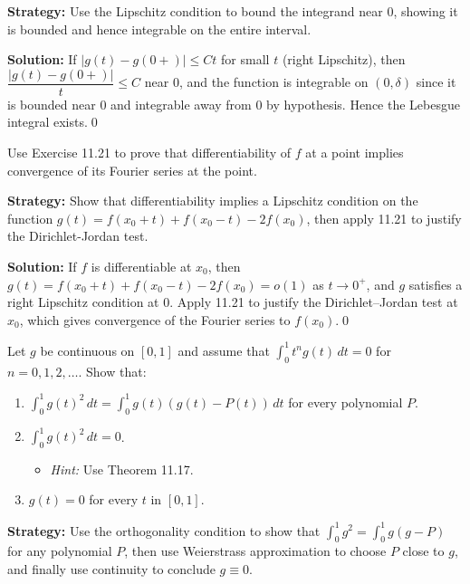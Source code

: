 \noindent\textbf{Strategy:} Use the Lipschitz condition to bound the integrand near 0, showing it is bounded and hence integrable on the entire interval.

\bigskip\noindent\textbf{Solution:}
If $|g(t)-g(0+)|\le C t$ for small $t$ (right Lipschitz), then $\dfrac{|g(t)-g(0+)|}{t}\le C$ near $0$, and the function is integrable on $(0,\delta)$ since it is bounded near $0$ and integrable away from $0$ by hypothesis. Hence the Lebesgue integral exists.\qed


\begin{problembox}
Use Exercise 11.21 to prove that differentiability of $f$ at a point implies convergence of its Fourier series at the point.
\end{problembox}

\noindent\textbf{Strategy:} Show that differentiability implies a Lipschitz condition on the function $g(t)=f(x_0+t)+f(x_0-t)-2f(x_0)$, then apply 11.21 to justify the Dirichlet-Jordan test.

\bigskip\noindent\textbf{Solution:}
If $f$ is differentiable at $x_0$, then $g(t)=f(x_0+t)+f(x_0-t)-2f(x_0)=o(1)$ as $t\to0^+$, and $g$ satisfies a right Lipschitz condition at $0$. Apply 11.21 to justify the Dirichlet–Jordan test at $x_0$, which gives convergence of the Fourier series to $f(x_0)$.\qed


\begin{problembox}
Let $g$ be continuous on $[0, 1]$ and assume that $\int_0^1 t^n g(t) \, dt = 0$ for $n = 0, 1, 2, \dots$. Show that:
\begin{enumerate}[label=(\alph*)]
\item $\int_0^1 g(t)^2 \, dt = \int_0^1 g(t)(g(t) - P(t)) \, dt$ for every polynomial $P$.
\item $\int_0^1 g(t)^2 \, dt = 0$.
\begin{itemize}
\item \textit{Hint:} Use Theorem 11.17.
\end{itemize}
\item $g(t) = 0$ for every $t$ in $[0, 1]$.
\end{enumerate}
\end{problembox}

\noindent\textbf{Strategy:} Use the orthogonality condition to show that $\int_0^1 g^2 = \int_0^1 g(g-P)$ for any polynomial $P$, then use Weierstrass approximation to choose $P$ close to $g$, and finally use continuity to conclude $g\equiv0$.

